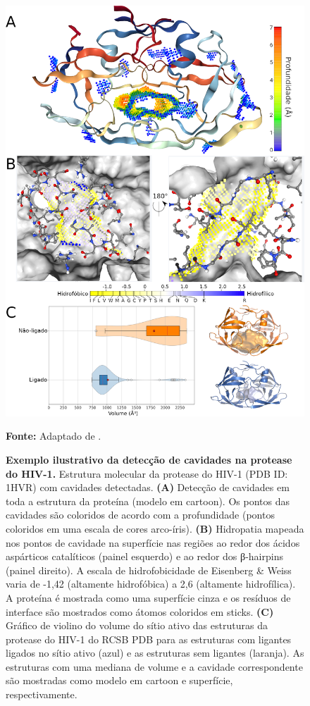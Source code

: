 \documentclass[Portugues]{phdquali}
\begin{document}
\begin{figure}[H]
  \centering
  \includegraphics[scale=1.6]{images/kvweb-case-study.png}
  \centerline{\scriptsize{\textbf{Fonte:} Adaptado de \cite{guerra2023A}.}}
  \caption[Exemplo ilustrativo da detecção de cavidades na protease do HIV-1]{\textbf{Exemplo ilustrativo da detecção de cavidades na protease do HIV-1.} Estrutura molecular da protease do HIV-1 (PDB ID: 1HVR) com cavidades detectadas. \textbf{(A)} Detecção de cavidades em toda a estrutura da proteína (modelo em cartoon). Os pontos das cavidades são coloridos de acordo com a profundidade (pontos coloridos em uma escala de cores arco-íris). \textbf{(B)} Hidropatia mapeada nos pontos de cavidade na superfície nas regiões ao redor dos ácidos aspárticos catalíticos (painel esquerdo) e ao redor dos β-hairpins (painel direito). A escala de hidrofobicidade de Eisenberg & Weiss varia de -1,42 (altamente hidrofóbica) a 2,6 (altamente hidrofílica). A proteína é mostrada como uma superfície cinza e os resíduos de interface são mostrados como átomos coloridos em sticks. \textbf{(C)} Gráfico de violino do volume do sítio ativo das estruturas da protease do HIV-1 do RCSB PDB para as estruturas com ligantes ligados no sítio ativo (azul) e as estruturas sem ligantes (laranja). As estruturas com uma mediana de volume e a cavidade correspondente são mostradas como modelo em cartoon e superfície, respectivamente.}
  \label{fig:kvweb-case-study}
\end{figure}
\end{document}

